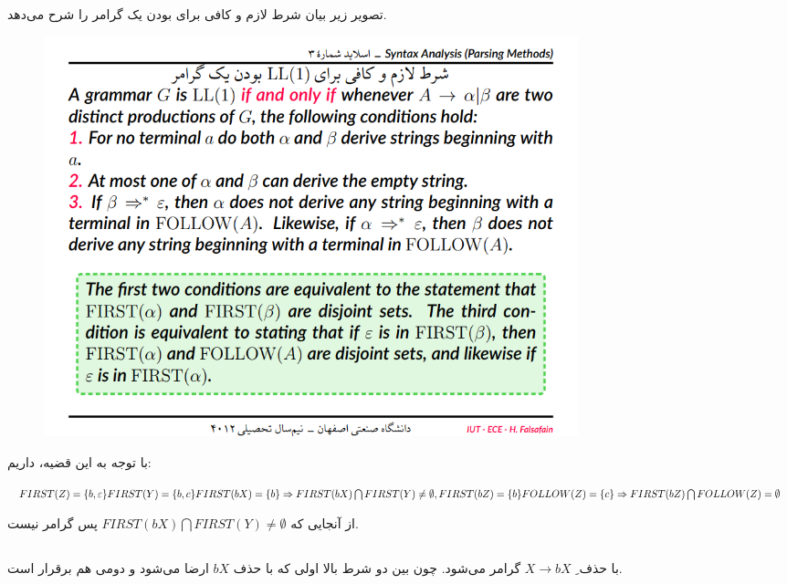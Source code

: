 \documentclass{article}
\begin{document}
\subsection{}
تصویر زیر بیان شرط لازم و کافی برای  بودن یک گرامر را شرح می‌دهد.
\begin{figure}[H]
    \centering
    \includegraphics[width=0.75\textwidth]{figures/3a.png}
    \caption
	{}
    \label{fig:fig1}
\end{figure}
با توجه به این قضیه، داریم:

\begin{latin}
$
FIRST(Z) = \lbrace b, \varepsilon \rbrace \\
FIRST(Y) = \lbrace b, c \rbrace \\
FIRST(bX) = \lbrace b \rbrace \\
\Rightarrow FIRST(bX) \bigcap FIRST(Y) \neq \emptyset \\
, \\
FIRST(bZ) = \lbrace b \rbrace \\
FOLLOW(Z) = \lbrace c \rbrace \\
\Rightarrow FIRST(bZ) \bigcap FOLLOW(Z) = \emptyset
$
\end{latin}
از آنجایی که $FIRST(bX) \bigcap FIRST(Y) \neq \emptyset$ پس گرامر  نیست.

\subsection{}
با حذف ِ $X \longrightarrow bX$ گرامر  می‌شود. چون بین دو شرط بالا اولی که با حذف $bX$ ارضا می‌شود و دومی هم برقرار است.


\section{}%
\end{document}
